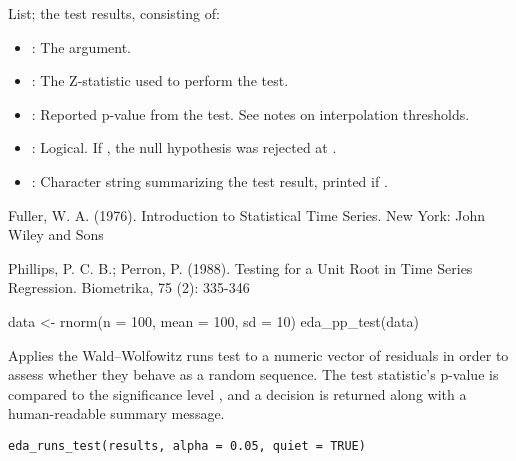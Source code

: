 \documentclass[a4paper]{book}
\begin{document}
%
\begin{Value}
List; the test results, consisting of:
\begin{itemize}

\item{} : The  argument.
\item{} : The Z-statistic used to perform the test.
\item{} : Reported p-value from the test. See notes on interpolation thresholds.
\item{} : Logical. If , the null hypothesis was rejected at .
\item{} : Character string summarizing the test result, printed if .

\end{itemize}

\end{Value}
%
\begin{References}
Fuller, W. A. (1976). Introduction to Statistical Time Series. New York:
John Wiley and Sons

Phillips, P. C. B.; Perron, P. (1988). Testing for a Unit Root in Time Series
Regression. Biometrika, 75 (2): 335-346
\end{References}
%
\begin{SeeAlso}
\end{SeeAlso}
%
\begin{Examples}
\begin{ExampleCode}
data <- rnorm(n = 100, mean = 100, sd = 10)
eda_pp_test(data)

\end{ExampleCode}
\end{Examples}
%
\begin{Description}
Applies the Wald–Wolfowitz runs test to a numeric vector of residuals in
order to assess whether they behave as a random sequence. The test statistic’s
p-value is compared to the significance level , and a decision is
returned along with a human-readable summary message.
\end{Description}
%
\begin{Usage}
\begin{verbatim}
eda_runs_test(results, alpha = 0.05, quiet = TRUE)
\end{verbatim}
\end{Usage}
\end{document}
